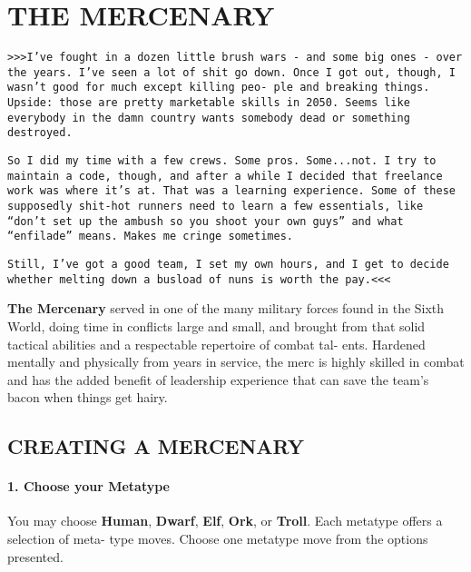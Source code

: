 
\section{THE MERCENARY}
\begin{multicols}{3}
\setlength{\parskip}{.05cm}

\texttt{>>>I’ve fought in a dozen little brush wars - and some big
ones - over the years. I’ve seen a lot of shit go down. Once I
got out, though, I wasn’t good for much except killing peo-
ple and breaking things. Upside: those are pretty marketable
skills in 2050. Seems like everybody in the damn country
wants somebody dead or something destroyed.}

\texttt{So I did my time with a few crews. Some pros. Some...not. I
try to maintain a code, though, and after a while I decided
that freelance work was where it’s at. That was a learning
experience. Some of these supposedly shit-hot runners need
to learn a few essentials, like “don’t set up the ambush so you
shoot your own guys” and what “enfilade” means. Makes me
cringe sometimes.}

\texttt{Still, I’ve got a good team, I set my own hours, and I get to
decide whether melting down a busload of nuns is worth the
pay.<<<}

\textbf{The Mercenary} served in one of the many military
forces found in the Sixth World, doing time in conflicts
large and small, and brought from that solid tactical
abilities and a respectable repertoire of combat tal-
ents. Hardened mentally and physically from years in
service, the merc is highly skilled in combat and has
the added benefit of leadership experience that can
save the team’s bacon when things get hairy.



\subsection{CREATING A MERCENARY}

\paragraph{1.  Choose your Metatype}

You may choose \textbf{Human}, \textbf{Dwarf}, \textbf{Elf}, \textbf{Ork}, or
\textbf{Troll}. Each metatype offers a selection of meta-
type moves. Choose one metatype move from
the options presented.


\end{multicols}
